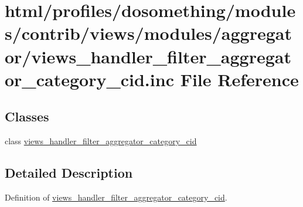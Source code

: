 \hypertarget{views__handler__filter__aggregator__category__cid_8inc}{
\section{html/profiles/dosomething/modules/contrib/views/modules/aggregator/views\_\-handler\_\-filter\_\-aggregator\_\-category\_\-cid.inc File Reference}
\label{views__handler__filter__aggregator__category__cid_8inc}
}
\subsection*{Classes}
\begin{DoxyCompactItemize}
\item 
class \hyperlink{classviews__handler__filter__aggregator__category__cid}{views\_\-handler\_\-filter\_\-aggregator\_\-category\_\-cid}
\end{DoxyCompactItemize}


\subsection{Detailed Description}
Definition of \hyperlink{classviews__handler__filter__aggregator__category__cid}{views\_\-handler\_\-filter\_\-aggregator\_\-category\_\-cid}. 